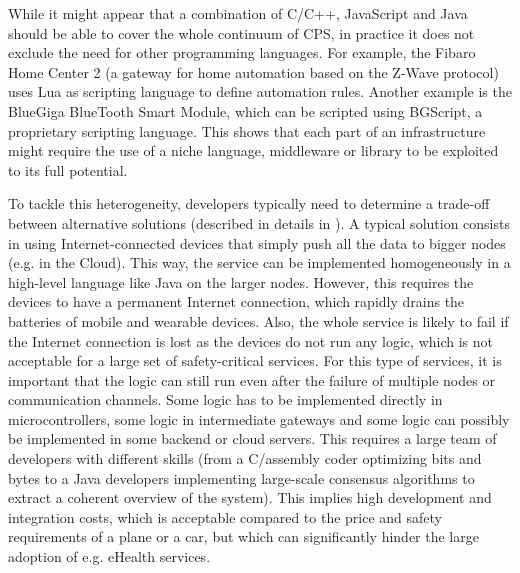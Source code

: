 While it might appear that a combination of C/C++, JavaScript and Java should be able to cover the whole continuum of CPS, in practice it does not exclude the need for other programming languages. For example, the Fibaro Home Center 2 (a gateway for home automation based on the Z-Wave protocol) uses Lua as scripting language to define automation rules. Another example is the BlueGiga BlueTooth Smart Module, which can be scripted using BGScript, a proprietary scripting language. This shows that each part of an infrastructure might require the use of a niche language, middleware or library to be exploited to its full potential. 

To tackle this heterogeneity, developers typically need to determine a trade-off between alternative solutions (described in details in \cite{DBLP:conf/icse/MorinFB15}). A typical solution consists in using Internet-connected devices that simply push all the data to bigger nodes (e.g. in the Cloud). This way, the service can be implemented homogeneously in a high-level language like Java on the larger nodes. However, this requires the devices to have a permanent Internet connection, which rapidly drains the batteries of mobile and wearable devices. Also, the whole service is likely to fail if the Internet connection is lost as the devices do not run any logic, which is not acceptable for a large set of safety-critical services. For this type of services, it is important that the logic can still run even after the failure of multiple nodes or communication channels. Some logic has to be implemented directly in microcontrollers, some logic in intermediate gateways and some logic can possibly be implemented in some backend or cloud servers. This requires a large team of developers with different skills (from a C/assembly coder optimizing bits and bytes to a Java developers implementing large-scale consensus algorithms to extract a coherent overview of the system). This implies high development and integration costs, which is acceptable compared to the price and safety requirements of a plane or a car, but which can significantly hinder the large adoption of e.g. eHealth services. 